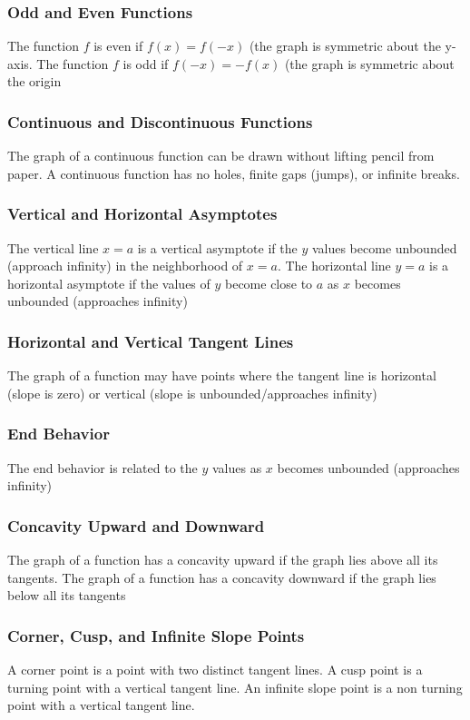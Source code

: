 \documentclass{article}
\begin{document}
	\subsubsection{Odd and Even Functions}
	The function $f$ is even if $f(x)=f(-x)$ (the graph is symmetric about the y-axis. The function $f$ is odd if $f(-x)=-f(x)$ (the graph is symmetric about the origin
	\subsubsection{Continuous and Discontinuous Functions}
	The graph of a continuous function can be drawn without lifting pencil from paper. A continuous function has no holes, finite gaps (jumps), or infinite breaks.
	\subsubsection{Vertical and Horizontal Asymptotes}
	The vertical line $x=a$ is a vertical asymptote if the $y$ values become unbounded (approach infinity) in the neighborhood of $x=a$. The horizontal line $y=a$ is a horizontal asymptote if the values of $y$ become close to $a$ as $x$ becomes unbounded (approaches infinity)
	\subsubsection{Horizontal and Vertical Tangent Lines}
	The graph of a function may have points where the tangent line is horizontal (slope is zero) or vertical (slope is unbounded/approaches infinity)
	\subsubsection{End Behavior}
	The end behavior is related to the $y$ values as $x$ becomes unbounded (approaches infinity)
	\subsubsection{Concavity Upward and Downward}
	The graph of a function has a concavity upward if the graph lies above all its tangents. The graph of a function has a concavity downward if the graph lies below all its tangents
	\subsubsection{Corner, Cusp, and Infinite Slope Points}
	A corner point is a point with two distinct tangent lines. A cusp point is a turning point with a vertical tangent line. An infinite slope point is a non turning point with a vertical tangent line.
\end{document}
